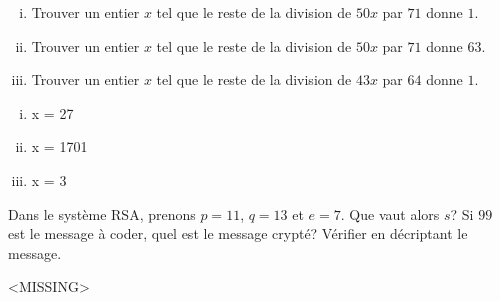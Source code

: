 \newpage

\vspace*{0.8cm}
\begin{exo} 
\begin{enumerate}[(i)]
\item Trouver un entier $x$ tel que le reste de la division de $50x$ par $71$ donne $1$.
\item Trouver un entier $x$ tel que le reste de la division de $50x$ par $71$ donne $63$.
\item Trouver un entier $x$ tel que le reste de la division de $43x$ par $64$ donne $1$.
\end{enumerate}
\end{exo}

\begin{enumerate}[(i)]
\item x = 27
\item x = 1701
\item x = 3
\end{enumerate}


\vspace*{0.8cm}
\begin{exo}
Dans le syst\`eme RSA, prenons $p=11$, $q=13$ et $e=7$. Que vaut alors $s$? Si $99$ est le message \`a coder, quel est le message crypt\'e? V\'erifier en d\'ecriptant le message.
\end{exo}

<MISSING>

\thispagestyle{empty}